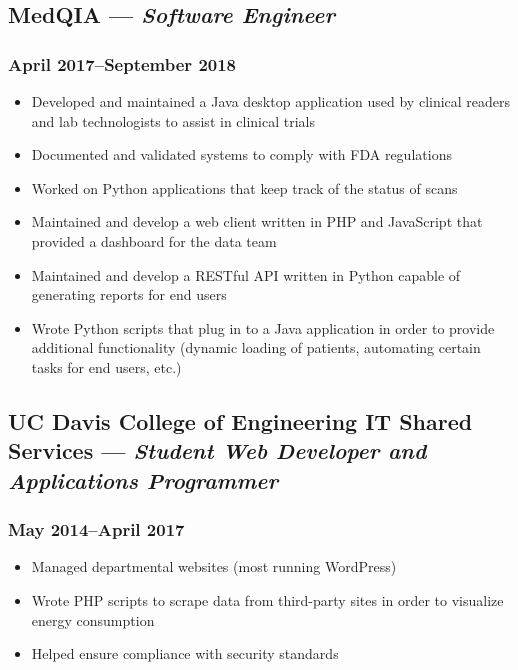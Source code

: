 \documentclass{article}
\begin{document}
\begin{minipage}[t]{.6\textwidth}
	\subsection*{MedQIA --- \textit{Software Engineer}}
	\subsubsection*{April 2017--September 2018}
	\begin{itemize}
		\item Developed and maintained a Java desktop application used by clinical readers
		      and lab technologists to assist in clinical trials
		\item Documented and validated systems to comply with FDA regulations
		\item Worked on Python applications that keep track of the status of scans
		\item Maintained and develop a web client written in PHP and JavaScript that provided
		      a dashboard for the data team
		\item Maintained and develop a RESTful API written in Python capable of generating
		      reports for end users
		\item Wrote Python scripts that plug in to a Java application in order to provide
		      additional functionality (dynamic loading of patients, automating certain tasks
		      for end users, etc.)
	\end{itemize}
	\subsection*{UC Davis College of Engineering IT Shared Services --- \textit{Student Web Developer and Applications Programmer}}
	\subsubsection*{May 2014--April 2017}
	\begin{itemize}
		\item Managed departmental websites (most running WordPress)
		\item Wrote PHP scripts to scrape data from third-party sites in order to visualize
		      energy consumption
		\item Helped ensure compliance with security standards
	\end{itemize}
\end{minipage}
\hspace{0.08\textwidth}
\end{document}
